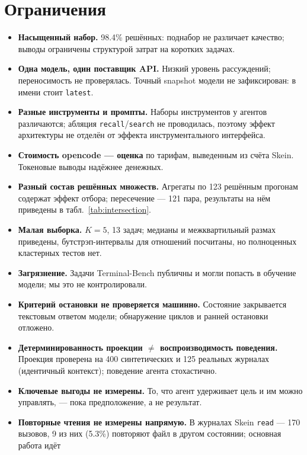 \documentclass[11pt,a4paper]{article}
\begin{document}
\section{Ограничения}
\label{sec:limitations}

\begin{itemize}[leftmargin=1.4em,itemsep=0.2em]
  \item \textbf{Насыщенный набор.} 98.4\% решённых: поднабор не различает качество;
  выводы ограничены структурой затрат на коротких задачах.
  \item \textbf{Одна модель, один поставщик API.} Низкий уровень рассуждений; переносимость
  не проверялась. Точный snapshot модели не зафиксирован: в имени стоит \texttt{latest}.
  \item \textbf{Разные инструменты и промпты.} Наборы инструментов у агентов различаются;
  абляция \texttt{recall}/\texttt{search} не проводилась, поэтому эффект архитектуры не
  отделён от эффекта инструментального интерфейса.
  \item \textbf{Стоимость opencode --- оценка} по тарифам, выведенным из счёта Skein.
  Токеновые выводы надёжнее денежных.
  \item \textbf{Разный состав решённых множеств.} Агрегаты по 123 решённым прогонам
  содержат эффект отбора; пересечение --- 121 пара, результаты на нём приведены в
  табл.~\ref{tab:intersection}.
  \item \textbf{Малая выборка.} $K=5$, 13 задач; медианы и межквартильный размах приведены,
  бутстрэп-интервалы для отношений посчитаны, но полноценных кластерных тестов нет.
  \item \textbf{Загрязнение.} Задачи Terminal-Bench публичны и могли попасть в обучение
  модели; мы это не контролировали.
  \item \textbf{Критерий остановки не проверяется машинно.} Состояние закрывается
  текстовым ответом модели; обнаружение циклов и ранней остановки отложено.
  \item \textbf{Детерминированность проекции $\neq$ воспроизводимость поведения.}
  Проекция проверена на 400 синтетических и 125 реальных журналах (идентичный контекст);
  поведение агента стохастично.
  \item \textbf{Ключевые выгоды не измерены.} То, что агент удерживает цель и им можно
  управлять, --- пока предположение, а не результат.
  \item \textbf{Повторные чтения не измерены напрямую.} В журналах Skein \texttt{read} ---
  170 вызовов, 9 из них (5.3\%) повторяют файл в другом состоянии; основная работа идёт

\end{itemize}
\end{document}
